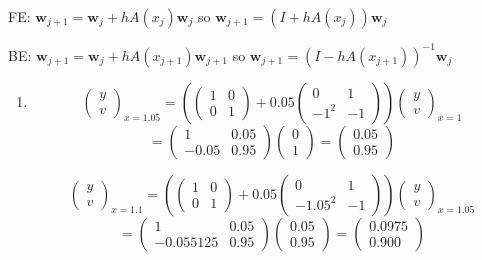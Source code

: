 \documentclass[11pt,a4paper]{article}
\begin{document}
\begin{enumerate}
{\begin{enumerate}
FE: $\mathbf{w}_{j+1} = \mathbf{w}_{j} + h A(x_j)\mathbf{w}_j$ so $\mathbf{w}_{j+1} = (I +hA(x_{j})) \mathbf{w}_{j}$

BE: $\mathbf{w}_{j+1} = \mathbf{w}_{j} + h A(x_{j+1})\mathbf{w}_{j+1}$ so $\mathbf{w}_{j+1} = (I -hA(x_{j+1}))^{-1} \mathbf{w}_{j}$

\begin{enumerate}
 \item  $$\left(\begin{array}{c} y \\ v\end{array} \right)_{x=1.05} = \left(   
 \left(\begin{array}{cc} 1 & 0 \\ 0  & 1\end{array} \right)
 + 0.05 \left(\begin{array}{cc} 0 & 1 \\ -1^2  & -1 \end{array} \right) 
 \right)
 \left(\begin{array}{c} y \\ v\end{array} \right)_{x=1}
 $$
 $$= \left(\begin{array}{cc} 1 & 0.05 \\ -0.05  & 0.95\end{array} \right) \left(\begin{array}{c} 0 \\ 1\end{array} \right)=\left(\begin{array}{c} 0.05 \\ 0.95\end{array} \right) $$ 
 
$$\left(\begin{array}{c} y \\ v\end{array} \right)_{x=1.1} = \left(   
 \left(\begin{array}{cc} 1 & 0 \\ 0  & 1\end{array} \right)
 + 0.05 \left(\begin{array}{cc} 0 & 1 \\ -1.05^2  & -1 \end{array} \right) 
 \right)
 \left(\begin{array}{c} y \\ v\end{array} \right)_{x=1.05}
 $$
 $$= \left(\begin{array}{cc} 1 & 0.05 \\ -0.055125  & 0.95\end{array} \right) \left(\begin{array}{c} 0.05 \\ 0.95 \end{array} \right)=\left(\begin{array}{c} 0.0975 \\ 0.900\end{array} \right) $$ 
 

\end{enumerate}
\end{enumerate}}
\end{enumerate}
\end{document}
